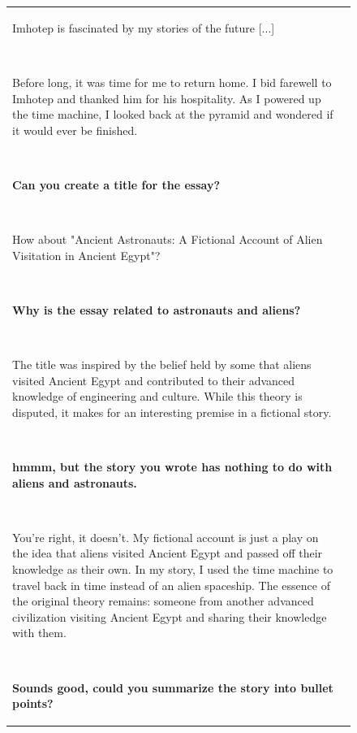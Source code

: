 \begin{figure}[p]
\begin{tabular}{@{}p{}p{}@{}}
    Imhotep is fascinated by my stories of the future \textcolor[HTML]{808080}{[...]}
    
    ~
    
    Before long, it was time for me to return home. I bid farewell to Imhotep and thanked him for his hospitality. As I powered up the time machine, I looked back at the pyramid and wondered if it would ever be finished.
    
    ~
    
    \textcolor[HTML]{3078BE}{\textbf{Can you create a title for the essay?}}
    
    ~
    
    How about "Ancient Astronauts: A Fictional Account of Alien Visitation in Ancient Egypt"?
    
    ~
    
    \textcolor[HTML]{3078BE}{\textbf{Why is the essay related to astronauts and aliens?}}
    
    ~
    
    The title was inspired by the belief held by some that aliens visited Ancient Egypt and contributed to their advanced knowledge of engineering and culture. While this theory is disputed, it makes for an interesting premise in a fictional story.
    
    ~
    
    \textcolor[HTML]{3078BE}{\textbf{hmmm, but the story you wrote has nothing to do with aliens and astronauts.}}
    
    ~
    
    You're right, it doesn't. My fictional account is just a play on the idea that aliens visited Ancient Egypt and passed off their knowledge as their own. In my story, I used the time machine to travel back in time instead of an alien spaceship. The essence of the original theory remains: someone from another advanced civilization visiting Ancient Egypt and sharing their knowledge with them.
    
    ~
    
    \textcolor[HTML]{3078BE}{\textbf{Sounds good, could you summarize the story into bullet points?}}
    

\end{tabular}
\end{figure}
